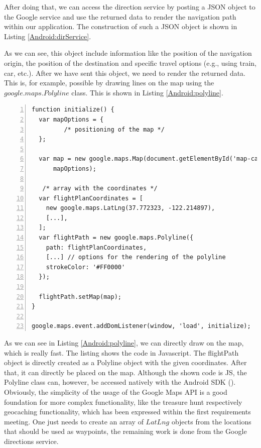 After doing that, we can access the direction service by posting a \ac{JSON} object to the Google service and use the returned data to render the navigation path within our application. The construction of such a \ac{JSON} object is shown in Listing \ref{Android:dirService}. 

As we can see, this object include information like the position of the navigation origin, the position of the destination and specific travel options (e.g., using train, car, etc.). After we have sent this object, we need to render the returned data. This is, for example, possible by drawing lines on the map using the $google.maps.Polyline$ class. This is shown in Listing \ref{Android:polyline}.

\clearpage 

\begin{lstlisting}[numbers=left,caption={Example for writing a poly line on the google map.},label=Android:polyline,frame=tlbr,breaklines]
function initialize() {
  var mapOptions = {
         /* positioning of the map */
  };

  var map = new google.maps.Map(document.getElementById('map-canvas'),
      mapOptions);

   /* array with the coordinates */
  var flightPlanCoordinates = [
    new google.maps.LatLng(37.772323, -122.214897),
    [...],
  ];
  var flightPath = new google.maps.Polyline({
    path: flightPlanCoordinates,
    [...] // options for the rendering of the polyline
    strokeColor: '#FF0000'
  });

  flightPath.setMap(map);
}

google.maps.event.addDomListener(window, 'load', initialize);
\end{lstlisting}

As we can see in Listing \ref{Android:polyline}, we can directly draw on the map, which is really fast. The listing shows the code in Javascript. The flightPath object is directly created as a Polyline object with the given coordinates. After that, it can directly be placed on the map. Although the shown code is \ac{JS}, the Polyline class can, however, be accessed natively with the Android SDK (\cite{GooglePolylineNative}). Obviously, the simplicity of the usage of the Google Maps API is a good foundation for more complex functionality, like the treasure hunt respectively geocaching functionality, which has been expressed within the first requirements meeting. One just needs to create an array of $LatLng$ objects from the locations that should be used as waypoints, the remaining work is done from the Google directions service.  

